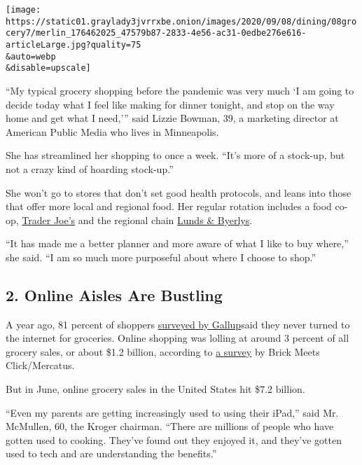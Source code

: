 \texttt{[image: https://static01.graylady3jvrrxbe.onion/images/2020/09/08/dining/08grocery7/merlin\_176462025\_47579b87-2833-4e56-ac31-0edbe276e616-articleLarge.jpg?quality=75\\\&auto=webp\\\&disable=upscale]}

``My typical grocery shopping before the pandemic was very much `I am
going to decide today what I feel like making for dinner tonight, and
stop on the way home and get what I need,''' said Lizzie Bowman, 39, a
marketing director at American Public Media who lives in Minneapolis.

She has streamlined her shopping to once a week. ``It's more of a
stock-up, but not a crazy kind of hoarding stock-up.''

She won't go to stores that don't set good health protocols, and leans
into those that offer more local and regional food. Her regular rotation
includes a food co-op, \href{https://www.traderjoes.com/}{Trader Joe's}
and the regional chain \href{https://lundsandbyerlys.com/}{Lunds \&
Byerlys}.

``It has made me a better planner and more aware of what I like to buy
where,'' she said. ``I am so much more purposeful about where I choose
to shop.''

\hypertarget{2-online-aisles-are-bustling}{%
\subsection{2. Online Aisles Are
Bustling}\label{2-online-aisles-are-bustling}}

A year ago, 81 percent of shoppers
\href{https://news.gallup.com/poll/264857/online-grocery-shopping-rare.aspx}{surveyed
by Gallup}said they never turned to the internet for groceries. Online
shopping was lolling at around 3 percent of all grocery sales, or about
\$1.2 billion, according to
\href{https://www.supermarketnews.com/retail-financial/us-online-grocery-sales-growth-tails-june}{a
survey} by Brick Meets Click/Mercatus.

But in June, online grocery sales in the United States hit \$7.2
billion.

``Even my parents are getting increasingly used to using their iPad,''
said Mr. McMullen, 60, the Kroger chairman. ``There are millions of
people who have gotten used to cooking. They've found out they enjoyed
it, and they've gotten used to tech and are understanding the
benefits.''

